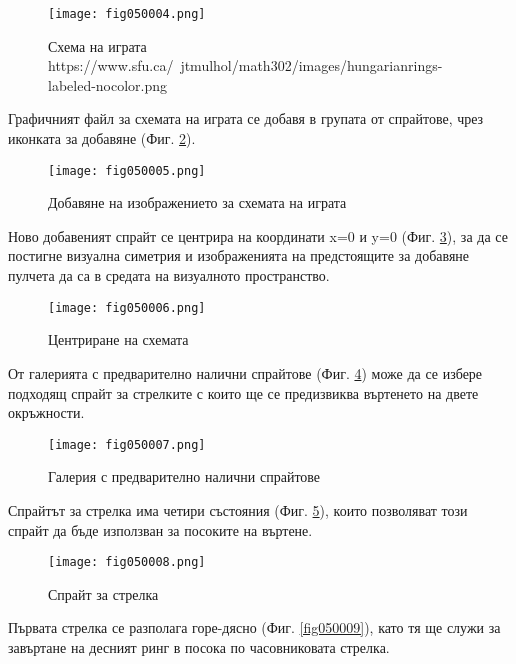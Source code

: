 \begin{figure}[H]
  \centering
  \texttt{[image: fig050004.png]}
  \caption{Схема на играта \\ https://www.sfu.ca/~jtmulhol/math302/images/hungarianrings-labeled-nocolor.png}
\label{fig050004}
\end{figure}

Графичният файл за схемата на играта се добавя в групата от спрайтове, чрез иконката за добавяне (Фиг. \ref{fig050005}).

\begin{figure}[H]
  \centering
  \texttt{[image: fig050005.png]}
  \caption{Добавяне на изображението за схемата на играта}
\label{fig050005}
\end{figure}

Ново добавеният спрайт се центрира на координати x=0 и y=0 (Фиг. \ref{fig050006}), за да се постигне визуална симетрия и изображенията на предстоящите за добавяне пулчета да са в средата на визуалното пространство. 

\begin{figure}[H]
  \centering
  \texttt{[image: fig050006.png]}
  \caption{Центриране на схемата}
\label{fig050006}
\end{figure}

От галерията с предварително налични спрайтове (Фиг. \ref{fig050007}) може да се избере подходящ спрайт за стрелките с които ще се предизвиква въртенето на двете окръжности.

\begin{figure}[H]
  \centering
  \texttt{[image: fig050007.png]}
  \caption{Галерия с предварително налични спрайтове}
\label{fig050007}
\end{figure}

Спрайтът за стрелка има четири състояния (Фиг. \ref{fig050008}), които позволяват този спрайт да бъде използван за посоките на въртене.

\begin{figure}[H]
  \centering
  \texttt{[image: fig050008.png]}
  \caption{Спрайт за стрелка}
\label{fig050008}
\end{figure}

Първата стрелка се разполага горе-дясно (Фиг. \ref{fig050009}), като тя ще служи за завъртане на десният ринг в посока по часовниковата стрелка.


